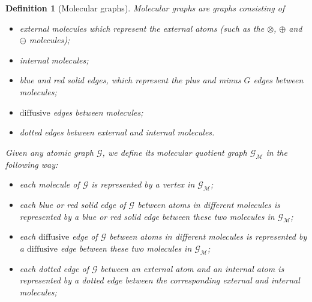 \documentclass{article}
\newcommand{\1}{\mathds{1}}
\numberwithin{equation}{section}
\renewcommand{\cal}{\mathcal}
\newcommand{\dashed}{\text{diffusive}}
\theoremstyle{plain} %
\newtheorem{definition}[theorem]{Definition}
\theoremstyle{remark}
\newcommand{\cor}{\color{red}}
\newcommand{\cob}{\color{purple}}
\newcommand{\nc}{\normalcolor}
\newcommand{\hty}[1]{{\cor (ht: #1) }}
\begin{document}
\begin{definition}[Molecular graphs] \label{def moleg}%
 Molecular graphs are graphs consisting of 
  \begin{itemize}
\item external molecules which represent the external atoms (such as the $\otimes$, $\oplus$ and $\ominus$ molecules);
\item internal molecules;
\item blue and red solid edges, which represent the plus and minus $G$ edges between molecules;
\item %
$\dashed$ edges between molecules;
\item dotted edges between %
external and internal molecules.
\end{itemize}
Given any atomic graph $\cal G$, we define its molecular quotient graph $ \cal G_{\cal M}$ in the following way:
\begin{itemize}
\item each molecule of $\cal G$ is represented by a vertex in $ \cal G_{\cal M}$;

\item each blue or red solid edge of $\cal G$ between atoms in different molecules is represented by a blue or red solid edge between these two molecules in $ \cal G_{\cal M}$;

\item each $\dashed$ edge of $\cal G$ between atoms in different molecules is represented by a $\dashed$ edge between these two molecules in $ \cal G_{\cal M}$;

\item each dotted edge of $\cal G$ between an external atom and an internal atom is represented by a dotted edge between the corresponding external and internal molecules;


\end{itemize}
\end{definition}
\end{document}
